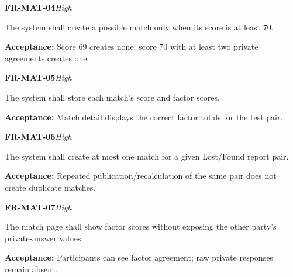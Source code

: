 \documentclass[12pt,a4paper,oneside]{report}
\begin{document}
\noindent\begin{minipage}{\linewidth}\textbf{FR-MAT-04}\hfill\textit{High}\par\nopagebreak

The system shall create a possible match only when its score is at least 70.

{\color{muted}\textbf{Acceptance:} Score 69 creates none; score 70 with at least two private agreements creates one.\par}\end{minipage}\par\vspace{5pt}

\noindent\begin{minipage}{\linewidth}\textbf{FR-MAT-05}\hfill\textit{High}\par\nopagebreak

The system shall store each match's score and factor scores.

{\color{muted}\textbf{Acceptance:} Match detail displays the correct factor totals for the test pair.\par}\end{minipage}\par\vspace{5pt}

\noindent\begin{minipage}{\linewidth}\textbf{FR-MAT-06}\hfill\textit{High}\par\nopagebreak

The system shall create at most one match for a given Lost/Found report pair.

{\color{muted}\textbf{Acceptance:} Repeated publication/recalculation of the same pair does not create duplicate matches.\par}\end{minipage}\par\vspace{5pt}

\noindent\begin{minipage}{\linewidth}\textbf{FR-MAT-07}\hfill\textit{High}\par\nopagebreak

The match page shall show factor scores without exposing the other party's private-answer values.

{\color{muted}\textbf{Acceptance:} Participants can see factor agreement; raw private responses remain absent.\par}\end{minipage}\par\vspace{5pt}
\end{document}
